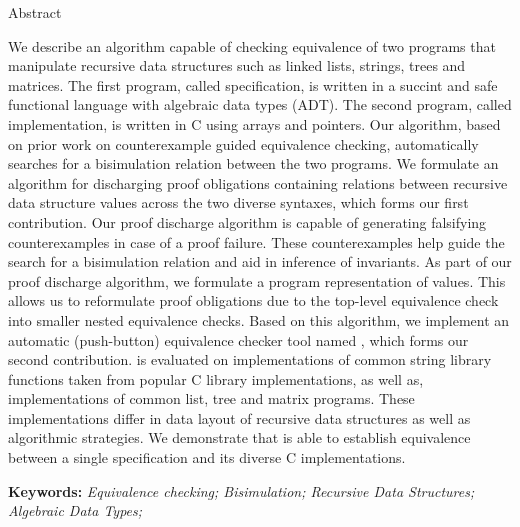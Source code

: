 \begin{center}

\LARGE{Abstract}
\end{center}
We describe an algorithm capable of checking
equivalence of two programs that manipulate recursive
data structures such as linked lists, strings, trees
and matrices. The first program, called specification,
is written in a succint and safe functional language
with algebraic data types (ADT).
The second program, called implementation,
is written in C using arrays and pointers.
Our algorithm, based on prior work on
counterexample guided equivalence checking,
automatically searches for a bisimulation
relation between the two programs.
We formulate an algorithm for discharging
proof obligations containing relations
between recursive data structure values across
the two diverse syntaxes, which forms our first contribution.
Our proof discharge algorithm is capable
of generating falsifying counterexamples in case of
a proof failure.
These counterexamples help guide the search for a bisimulation relation
and aid in inference of invariants.
As part of our proof discharge algorithm,
we formulate a program representation of values.
This allows us to reformulate proof obligations
due to the top-level equivalence check
into smaller nested equivalence checks.
Based on this algorithm,
we implement an automatic (push-button) equivalence checker tool named \toolName{},
which forms our second contribution.
\toolName{} is evaluated on
implementations of common string library
functions taken from popular C library implementations,
as well as,
implementations of common list, tree and matrix programs.
These implementations differ in data layout
of recursive data structures as well as
algorithmic strategies.
We demonstrate that \toolName{} is able to establish equivalence
between a single specification and its diverse C implementations.


\textbf{Keywords:} \textit{Equivalence checking; Bisimulation; Recursive Data Structures; Algebraic Data Types;}

\setlength{\parindent}{1.0em}
